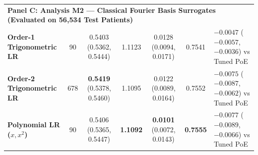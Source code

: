 \documentclass[10pt,a4paper,twoside]{article}
\begin{document}
\begin{table}[t]
{\begin{tabular}{l c c c c c l}
\midrule
\multicolumn{7}{l}{\textbf{Panel C: Analysis M2 --- Classical Fourier Basis Surrogates (Evaluated on 56,534 Test Patients)}} \\
\textbf{Order-1 Trigonometric LR} & 90 & 0.5403 (0.5362, 0.5444) & 1.1123 & 0.0128 (0.0094, 0.0171) & 0.7541 & $-0.0047$ ($-0.0057$, $-0.0036$) vs Tuned PoE \\
\textbf{Order-2 Trigonometric LR} & 678 & \textbf{0.5419} (0.5378, 0.5460) & 1.1095 & 0.0122 (0.0089, 0.0164) & 0.7552 & $-0.0075$ ($-0.0087$, $-0.0062$) vs Tuned PoE \\
\textbf{Polynomial LR ($x, x^2$)} & 90 & 0.5406 (0.5365, 0.5447) & \textbf{1.1092} & \textbf{0.0101} (0.0072, 0.0143) & \textbf{0.7555} & $-0.0077$ ($-0.0089$, $-0.0066$) vs Tuned PoE \\
\bottomrule
\end{tabular}}%
\vspace{6pt}
\end{table}
\end{document}

